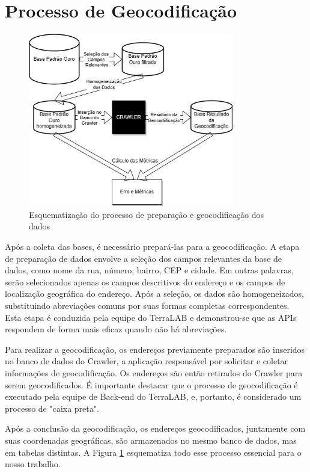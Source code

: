 \section{Processo de Geocodificação}

\begin{figure}
    \centering
    \includegraphics[width=0.8\textwidth]{Figuras/diagrama monografia.drawio.png}
    \caption{Esquematização do processo de preparação e geocodificação dos dados}
    \label{fig:diagramaMono}
\end{figure}
Após a coleta das bases, é necessário prepará-las para a geocodificação. A etapa de preparação de dados envolve a seleção dos campos relevantes da base de dados, como nome da rua, número, bairro, CEP e cidade. Em outras palavras, serão selecionados apenas os campos descritivos do endereço e os campos de localização geográfica do endereço. Após a seleção, os dados são homogeneizados, substituindo abreviações comuns por suas formas completas correspondentes. Esta etapa é conduzida pela equipe do TerraLAB e demonstrou-se que as APIs respondem de forma mais eficaz quando não há abreviações.

Para realizar a geocodificação, os endereços previamente preparados são inseridos no banco de dados do Crawler, a aplicação responsável por solicitar e coletar informações de geocodificação. Os endereços são então retirados do Crawler para serem geocodificados. É importante destacar que o processo de geocodificação é executado pela equipe de Back-end do TerraLAB, e, portanto, é considerado um processo de "caixa preta".

Após a conclusão da geocodificação, os endereços geocodificados, juntamente com suas coordenadas geográficas, são armazenados no mesmo banco de dados, mas em tabelas distintas. A Figura \ref{fig:diagramaMono} esquematiza todo esse processo essencial para o nosso trabalho.

